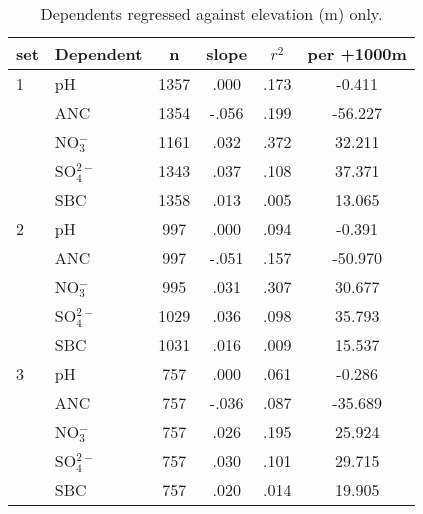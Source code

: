 \begin{table}[htbp]
\centering
\caption{Dependents regressed against elevation (m) only.}
\begin{tabular}{llcccc}
\toprule
set & Dependent & n & slope&$r^2$&per +1000m \\ 
\midrule
1   & pH               & 1357 & .000 & .173 & -0.411  \\ 
     & ANC            & 1354 & -.056 & .199 & -56.227  \\ 
     &  NO$_3^-$ & 1161 & .032 & .372 & 32.211  \\ 
     &  SO$_4^{2-}$& 1343 & .037 & .108 & 37.371  \\ 
     & SBC             & 1358 & .013 & .005 & 13.065  \\ 
\midrule
2   & pH               & 997 & .000 & .094 & -0.391  \\ 
     & ANC            & 997 & -.051 & .157 & -50.970  \\ 
     &  NO$_3^-$  & 995 & .031 & .307 & 30.677  \\ 
     &  SO$_4^{2-}$ & 1029 & .036 & .098 & 35.793  \\ 
     & SBC             & 1031 & .016 & .009 & 15.537  \\ 
 \midrule
3   & pH              & 757 & .000 & .061 & -0.286  \\ 
     & ANC           & 757 & -.036 & .087 & -35.689  \\ 
     &  NO$_3^-$ & 757 & .026 & .195 & 25.924  \\ 
     &  SO$_4^{2-}$ & 757 & .030 & .101 & 29.715  \\ 
     & SBC            & 757 & .020 & .014 & 19.905  \\ 
 \bottomrule
\end{tabular}
\label{Water quality per elevation}
\end{table}
